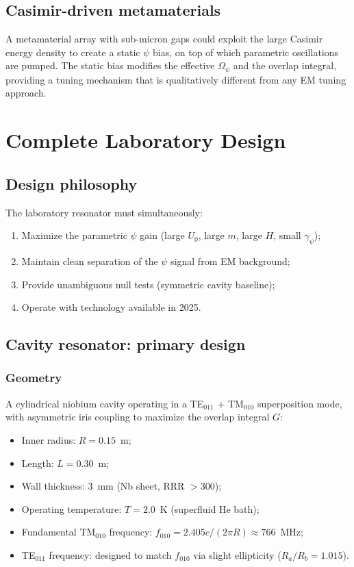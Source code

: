 \documentclass[12pt,aps,prd,twocolumn,superscriptaddress,nofootinbib]{revtex4-2}
\newcommand{\Opsi}{\Omega_\psi}
\newcommand{\gpsi}{\gamma_\psi}
\begin{document}
\subsection{Casimir-driven metamaterials}

A metamaterial array with sub-micron gaps could exploit the large
Casimir energy density to create a static $\psi$ bias, on top of which
parametric oscillations are pumped.  The static bias modifies the
effective $\Opsi$ and the overlap integral, providing a tuning
mechanism that is qualitatively different from any EM tuning approach.


\section{Complete Laboratory Design}
\label{sec:engineering}

\subsection{Design philosophy}

The laboratory resonator must simultaneously:
\begin{enumerate}[noitemsep]
  \item Maximize the parametric $\psi$ gain (large $U_0$, large $m$,
    large $H$, small $\gpsi$);
  \item Maintain clean separation of the $\psi$ signal from EM
    background;
  \item Provide unambiguous null tests (symmetric cavity baseline);
  \item Operate with technology available in 2025.
\end{enumerate}

\subsection{Cavity resonator: primary design}

\subsubsection{Geometry}

A cylindrical niobium cavity operating in a TE$_{011}$ + TM$_{010}$
superposition mode, with asymmetric iris coupling to maximize the
overlap integral $G$:
\begin{itemize}[noitemsep]
  \item Inner radius: $R = 0.15$~m;
  \item Length: $L = 0.30$~m;
  \item Wall thickness: $3$~mm (Nb sheet, RRR $> 300$);
  \item Operating temperature: $T = 2.0$~K (superfluid He bath);
  \item Fundamental TM$_{010}$ frequency:
    $f_{010} = 2.405c/(2\pi R) \approx 766$~MHz;
  \item TE$_{011}$ frequency: designed to match $f_{010}$ via
    slight ellipticity ($R_a/R_b = 1.015$).
\end{itemize}
\end{document}
